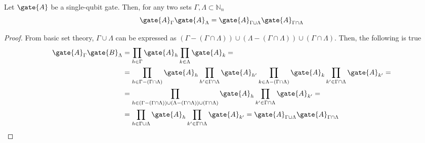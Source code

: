 \begin{proposition}
    Let $\gate{A}$ be a single-qubit gate.
    Then, for any two sets $\Gamma, \Lambda \subset \mathbb{N}_n$
    \begin{equation}
        \label{eq:junta-puertas}
        \gate{A}_\Gamma\gate{A}_{\Lambda} = \gate{A}_{\Gamma\cup\Lambda}\gate{A}_{\Gamma\cap\Lambda}
    \end{equation}
    
\end{proposition}
\begin{proof}
    From basic set theory, $\Gamma\cup\Lambda$ can be expressed as $(\Gamma-(\Gamma\cap\Lambda))\cup(\Lambda-(\Gamma\cap\Lambda))\cup(\Gamma\cap\Lambda)$. Then, the following is true
    \begin{align*}
        \gate{A}_{\Gamma}\gate{B}_{\Lambda}&=\prod_{h\in\Gamma}\gate{A}_{h}\prod_{k\in\Lambda}\gate{A}_{k}=\\
        &=\prod_{h\in\Gamma-(\Gamma\cap\Lambda)}\gate{A}_{h}\prod_{h^\prime\in\Gamma\cap\Lambda}\gate{A}_{h^\prime}\prod_{k\in\Lambda-(\Gamma\cap\Lambda)}\gate{A}_{k}\prod_{k^\prime\in\Gamma\cap\Lambda}\gate{A}_{k^\prime}=\\
        &=\prod_{h\in(\Gamma-(\Gamma\cap\Lambda))\cup(\Lambda-(\Gamma\cap\Lambda))\cup(\Gamma\cap\Lambda)}\gate{A}_{h}\prod_{k^\prime\in\Gamma\cap\Lambda}\gate{A}_{k^\prime}=\\
        &=\prod_{h\in\Gamma\cup\Lambda}\gate{A}_{h}\prod_{k^\prime\in\Gamma\cap\Lambda}\gate{A}_{k^\prime}=\gate{A}_{\Gamma\cup\Lambda}\gate{A}_{\Gamma\cap\Lambda}
    \end{align*}
\end{proof}

